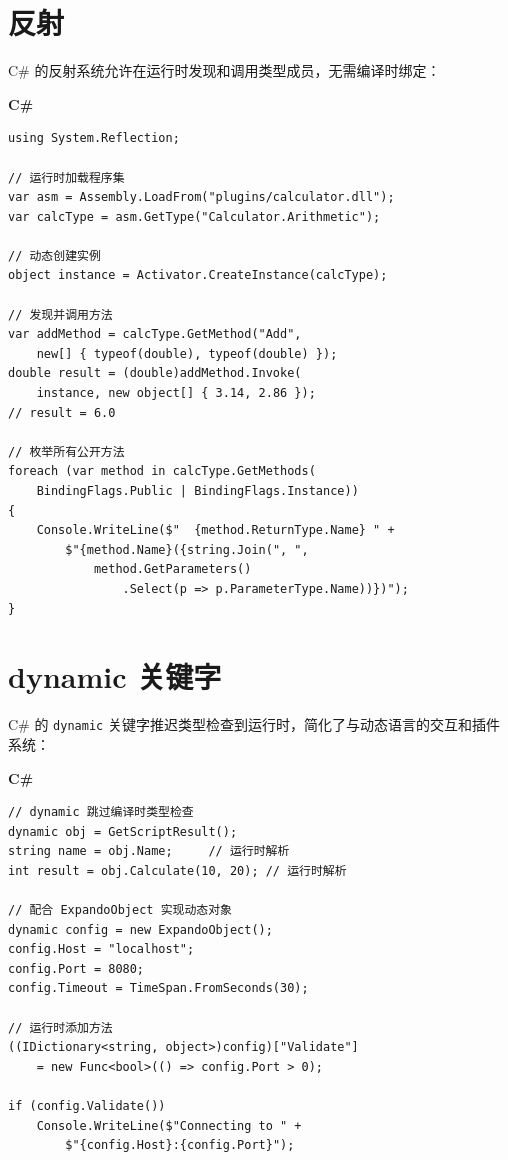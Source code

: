 \documentclass[12pt,a4paper,fontset=fandol]{ctexbook}
\newcommand{\Tp}[1]{\texttt{#1}}
\newcommand{\csharplabel}{%
  \noindent\begin{tcolorbox}[colback=csharpheadbg,coltext=white,
    sharp corners,boxrule=0pt,width=3.2em,height=1.4em,
    halign=center,valign=center,nobeforeafter,left=0pt,right=0pt,
    top=0pt,bottom=0pt]\small\bfseries C\#\end{tcolorbox}}
\begin{document}
\section{反射}\label{sec:reflection}

C\# 的反射系统允许在运行时发现和调用类型成员，无需编译时绑定：

\csharplabel
\begin{lstlisting}[style=csharpstyle]
using System.Reflection;

// 运行时加载程序集
var asm = Assembly.LoadFrom("plugins/calculator.dll");
var calcType = asm.GetType("Calculator.Arithmetic");

// 动态创建实例
object instance = Activator.CreateInstance(calcType);

// 发现并调用方法
var addMethod = calcType.GetMethod("Add",
    new[] { typeof(double), typeof(double) });
double result = (double)addMethod.Invoke(
    instance, new object[] { 3.14, 2.86 });
// result = 6.0

// 枚举所有公开方法
foreach (var method in calcType.GetMethods(
    BindingFlags.Public | BindingFlags.Instance))
{
    Console.WriteLine($"  {method.ReturnType.Name} " +
        $"{method.Name}({string.Join(", ",
            method.GetParameters()
                .Select(p => p.ParameterType.Name))})");
}
\end{lstlisting}

\section{dynamic 关键字}\label{sec:dynamic}

C\# 的 \Tp{dynamic} 关键字推迟类型检查到运行时，简化了与动态语言的交互和插件系统：

\csharplabel
\begin{lstlisting}[style=csharpstyle]
// dynamic 跳过编译时类型检查
dynamic obj = GetScriptResult();
string name = obj.Name;     // 运行时解析
int result = obj.Calculate(10, 20); // 运行时解析

// 配合 ExpandoObject 实现动态对象
dynamic config = new ExpandoObject();
config.Host = "localhost";
config.Port = 8080;
config.Timeout = TimeSpan.FromSeconds(30);

// 运行时添加方法
((IDictionary<string, object>)config)["Validate"]
    = new Func<bool>(() => config.Port > 0);

if (config.Validate())
    Console.WriteLine($"Connecting to " +
        $"{config.Host}:{config.Port}");
\end{lstlisting}
\end{document}
